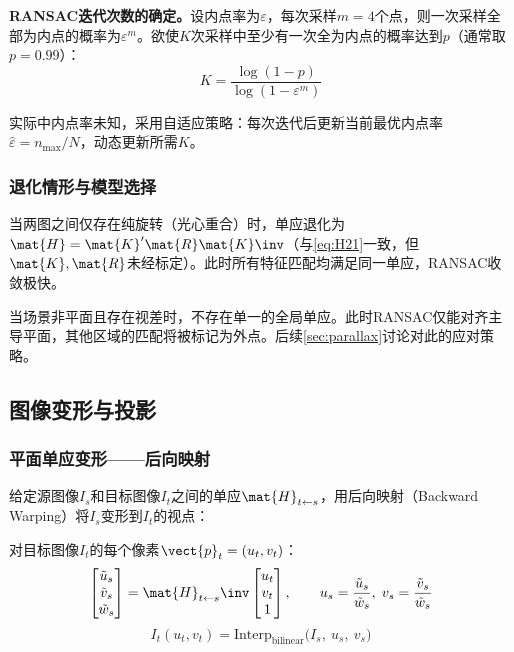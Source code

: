 \noindent\textbf{RANSAC迭代次数的确定。}设内点率为$\varepsilon$，每次采样$m=4$个点，则一次采样全部为内点的概率为$\varepsilon^m$。欲使$K$次采样中至少有一次全为内点的概率达到$p$（通常取$p=0.99$）：
\begin{equation}
K = \frac{\log(1-p)}{\log(1-\varepsilon^m)}
\label{eq:ransac-K}
\end{equation}

实际中内点率未知，采用自适应策略：每次迭代后更新当前最优内点率$\hat{\varepsilon} = n_{\max}/N$，动态更新所需$K$。

\subsubsection{退化情形与模型选择}

当两图之间仅存在纯旋转（光心重合）时，单应退化为$\mat{H} = \mat{K}'\mat{R}\mat{K}\inv$（与\cref{eq:H21}一致，但$\mat{K},\mat{R}$未经标定）。此时所有特征匹配均满足同一单应，RANSAC收敛极快。

当场景非平面且存在视差时，不存在单一的全局单应。此时RANSAC仅能对齐主导平面，其他区域的匹配将被标记为外点。后续\cref{sec:parallax}讨论对此的应对策略。

\subsection{图像变形与投影}
\label{sec:image-warping}

\subsubsection{平面单应变形——后向映射}

给定源图像$I_s$和目标图像$I_t$之间的单应$\mat{H}_{t \gets s}$，用后向映射（Backward Warping）将$I_s$变形到$I_t$的视点：

\begin{resultbox}
对目标图像$I_t$的每个像素$\vect{p}_t = (u_t,v_t)$：
\[
\begin{bmatrix}
\tilde{u}_s \\ \tilde{v}_s \\ \tilde{w}_s
\end{bmatrix}
= \mat{H}_{t \gets s}\inv
\begin{bmatrix}
u_t \\ v_t \\ 1
\end{bmatrix},
\qquad
u_s = \frac{\tilde{u}_s}{\tilde{w}_s},\;
v_s = \frac{\tilde{v}_s}{\tilde{w}_s}
\]
\[
I_t(u_t, v_t) = \text{Interp}_{\text{bilinear}}\bigl(I_s,\ u_s,\ v_s\bigr)
\]
\end{resultbox}

